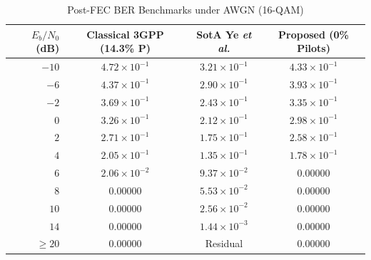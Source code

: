 ﻿\documentclass[journal,twoside]{IEEEtran}
\begin{document}
\begin{table}[t]
\caption{Post-FEC BER Benchmarks under AWGN (16-QAM)}
\label{tab:awgn_16qam}
\centering
\footnotesize
\setlength{\tabcolsep}{4pt}
\begin{tabular}{r@{\quad}ccc}
\toprule
$E_b/N_0$ (dB) & Classical 3GPP (14.3\% P) & SotA Ye \textit{et al.} \cite{ye2018} & \textbf{Proposed (0\% Pilots)} \\
\midrule
$-10$ & $4.72\times 10^{-1}$ & $3.21\times 10^{-1}$ & $4.33\times 10^{-1}$ \\
$-6$  & $4.37\times 10^{-1}$ & $2.90\times 10^{-1}$ & $3.93\times 10^{-1}$ \\
$-2$  & $3.69\times 10^{-1}$ & $2.43\times 10^{-1}$ & $3.35\times 10^{-1}$ \\
$0$   & $3.26\times 10^{-1}$ & $2.12\times 10^{-1}$ & $2.98\times 10^{-1}$ \\
$2$   & $2.71\times 10^{-1}$ & $1.75\times 10^{-1}$ & $2.58\times 10^{-1}$ \\
$4$   & $2.05\times 10^{-1}$ & $1.35\times 10^{-1}$ & $1.78\times 10^{-1}$ \\
$6$   & $2.06\times 10^{-2}$ & $9.37\times 10^{-2}$ & $\mathbf{0.00000}$ \\
$8$   & $0.00000$            & $5.53\times 10^{-2}$ & $\mathbf{0.00000}$ \\
$10$  & $0.00000$            & $2.56\times 10^{-2}$ & $\mathbf{0.00000}$ \\
$14$  & $0.00000$            & $1.44\times 10^{-3}$ & $\mathbf{0.00000}$ \\
$\geq 20$ & $0.00000$        & Residual              & $\mathbf{0.00000}$ \\
\bottomrule
\end{tabular}
\end{table}
\end{document}
